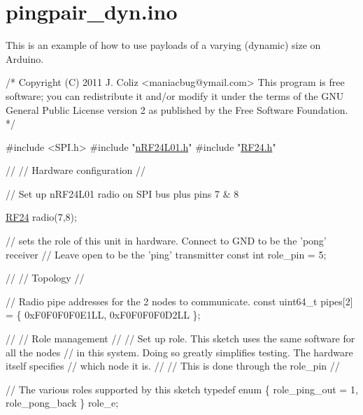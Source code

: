 \hypertarget{pingpair_dyn_8ino-example}{}\section{pingpair\+\_\+dyn.\+ino}
This is an example of how to use payloads of a varying (dynamic) size on Arduino.


\begin{DoxyCodeInclude}
\textcolor{comment}{/*}
\textcolor{comment}{ Copyright (C) 2011 J. Coliz <maniacbug@ymail.com>}
\textcolor{comment}{}
\textcolor{comment}{ This program is free software; you can redistribute it and/or}
\textcolor{comment}{ modify it under the terms of the GNU General Public License}
\textcolor{comment}{ version 2 as published by the Free Software Foundation.}
\textcolor{comment}{ */}

\textcolor{preprocessor}{#include <SPI.h>}
\textcolor{preprocessor}{#include "\hyperlink{nRF24L01_8h}{nRF24L01.h}"}
\textcolor{preprocessor}{#include "\hyperlink{RF24_8h}{RF24.h}"}

\textcolor{comment}{//}
\textcolor{comment}{// Hardware configuration}
\textcolor{comment}{//}

\textcolor{comment}{// Set up nRF24L01 radio on SPI bus plus pins 7 & 8}

\hyperlink{classRF24}{RF24} radio(7,8);

\textcolor{comment}{// sets the role of this unit in hardware.  Connect to GND to be the 'pong' receiver}
\textcolor{comment}{// Leave open to be the 'ping' transmitter}
\textcolor{keyword}{const} \textcolor{keywordtype}{int} role\_pin = 5;

\textcolor{comment}{//}
\textcolor{comment}{// Topology}
\textcolor{comment}{//}

\textcolor{comment}{// Radio pipe addresses for the 2 nodes to communicate.}
\textcolor{keyword}{const} uint64\_t pipes[2] = \{ 0xF0F0F0F0E1LL, 0xF0F0F0F0D2LL \};

\textcolor{comment}{//}
\textcolor{comment}{// Role management}
\textcolor{comment}{//}
\textcolor{comment}{// Set up role.  This sketch uses the same software for all the nodes}
\textcolor{comment}{// in this system.  Doing so greatly simplifies testing.  The hardware itself specifies}
\textcolor{comment}{// which node it is.}
\textcolor{comment}{//}
\textcolor{comment}{// This is done through the role\_pin}
\textcolor{comment}{//}

\textcolor{comment}{// The various roles supported by this sketch}
\textcolor{keyword}{typedef} \textcolor{keyword}{enum} \{ role\_ping\_out = 1, role\_pong\_back \} role\_e;


\end{DoxyCodeInclude}

